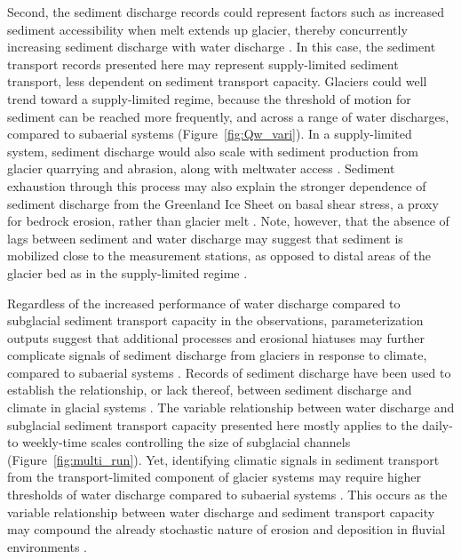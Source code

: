 \documentclass[11pt]{article}
\begin{document}
Second, the sediment discharge records could represent factors such as increased sediment accessibility when melt extends up glacier, thereby concurrently increasing sediment discharge with water discharge \citep[e.g.][]{delaney2020}.
In this case, the sediment transport records presented here may represent supply-limited sediment transport, less dependent on sediment transport capacity.
Glaciers could well trend toward a supply-limited regime, because the threshold of motion for sediment can be reached more frequently, and across a range of water discharges, compared to subaerial systems (Figure~\ref{fig:Qw_vari}).
In a supply-limited system, sediment discharge would also scale with sediment production from glacier quarrying and abrasion, along with meltwater access \citep[e.g.][]{herman2015,ugelvig2018,delaney2023}.
 Sediment exhaustion through this process may also explain the stronger dependence of sediment discharge from the Greenland Ice Sheet on basal shear stress, a proxy for bedrock erosion, rather than glacier melt \citep{overeem2017}.
Note, however, that the absence of lags between sediment and water discharge may suggest that sediment is mobilized close to the measurement stations, as opposed to distal areas of the glacier bed as in the supply-limited regime \citep[Figure~\ref{fig:model_outs}\, a and e; ][]{williams1989}.



Regardless of the increased performance of water discharge compared to subglacial sediment transport capacity in the observations, parameterization outputs suggest that additional processes and erosional hiatuses may further complicate signals of sediment discharge from glaciers in response to climate, compared to subaerial systems \citep{jansson2005,ganti2016}.
Records of sediment discharge have been used to establish the relationship, or lack thereof, between sediment discharge and climate in glacial systems \citep[e.g.][]{koppes2009a,willenbring2016,mariotti2021}.
The variable relationship between water discharge and subglacial sediment transport capacity presented here mostly applies to the daily- to weekly-time scales controlling the size of subglacial channels (Figure~\ref{fig:multi_run}).
Yet, identifying climatic signals in sediment transport from the transport-limited component of glacier systems may require higher thresholds of water discharge compared to subaerial systems \citep[Figure~\ref{fig:Qw_vari}; ][]{tofelde2021}.
This occurs as the variable relationship between water discharge and sediment transport capacity
may compound  the already stochastic nature of erosion and deposition in fluvial environments \citep{castletort2003,jerolmack2010}.
\end{document}
